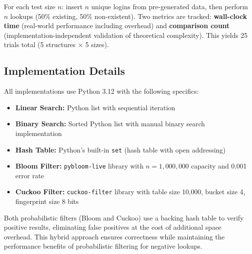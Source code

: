 For each test size $n$: insert $n$ unique logins from pre-generated data, then perform $n$ lookups (50\% existing, 50\% non-existent). Two metrics are tracked: \textbf{wall-clock time} (real-world performance including overhead) and \textbf{comparison count} (implementation-independent validation of theoretical complexity). This yields 25 trials total (5 structures × 5 sizes).

\subsection{Implementation Details}

All implementations use Python 3.12 with the following specifics:

\begin{itemize}
    \item \textbf{Linear Search:} Python list with sequential iteration
    \item \textbf{Binary Search:} Sorted Python list with manual binary search implementation
    \item \textbf{Hash Table:} Python's built-in \texttt{set} (hash table with open addressing)
    \item \textbf{Bloom Filter:} \texttt{pybloom-live} library with $n=1,000,000$ capacity and 0.001 error rate
    \item \textbf{Cuckoo Filter:} \texttt{cuckoo-filter} library with table size 10,000, bucket size 4, fingerprint size 8 bits
\end{itemize}

Both probabilistic filters (Bloom and Cuckoo) use a backing hash table to verify positive results, eliminating false positives at the cost of additional space overhead. This hybrid approach ensures correctness while maintaining the performance benefits of probabilistic filtering for negative lookups.


